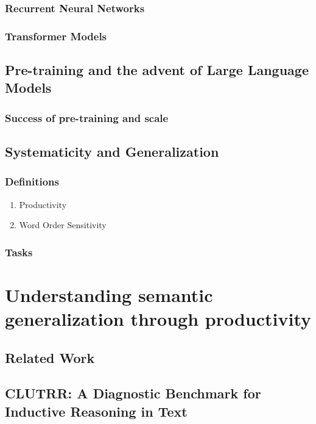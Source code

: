 \documentclass[letterpaper, 11pt]{article}
\begin{document}
\subsubsection{Recurrent Neural Networks}
\label{sec:org45b07d3}
\subsubsection{Transformer Models}
\label{sec:org419ecc5}
\subsection{Pre-training and the advent of Large Language Models}
\label{sec:orgfeea314}
\subsubsection{Success of pre-training and scale}
\label{sec:org1f27a82}
\subsection{Systematicity and Generalization}
\label{sec:org4964967}
\subsubsection{Definitions}
\label{sec:orge3e2d4c}
\begin{enumerate}
\item Productivity
\label{sec:orgf2d9fac}
\item Word Order Sensitivity
\label{sec:org1a6941d}
\end{enumerate}
\subsubsection{Tasks}
\label{sec:org1b919b9}
\clearpage
\section{Understanding semantic generalization through productivity}
\label{sec:org2423bcb}

\subsection{Related Work}
\label{sec:orgf9f5916}
\subsection{CLUTRR: A Diagnostic Benchmark for Inductive Reasoning in Text}
\label{sec:orgc39a643}
\end{document}
